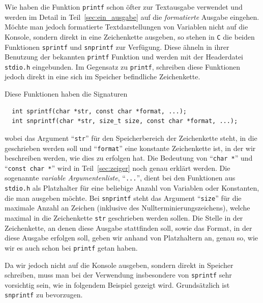 Wie haben die Funktion \texttt{printf} schon öfter zur Textausgabe verwendet und werden im Detail in Teil~\ref{sec:ein_ausgabe} auf die \emph{formatierte} Ausgabe eingehen.
Möchte man jedoch formatierte Textdarstellungen von Variablen nicht auf die Konsole, sondern direkt in eine Zeichenkette ausgeben, so stehen in \texttt{C} die beiden Funktionen \texttt{sprintf} und \texttt{snprintf} zur Verfügung.
Diese ähneln in ihrer Benutzung der bekannten \texttt{printf} Funktion und werden mit der Headerdatei \texttt{stdio.h} eingebunden.
Im Gegensatz zu \texttt{printf}, schreiben diese Funktionen jedoch direkt in eine sich im Speicher befindliche Zeichenkette.

Diese Funktionen haben die Signaturen
\begin{lstlisting}
  int sprintf(char *str, const char *format, ...);
  int snprintf(char *str, size_t size, const char *format, ...);
\end{lstlisting}
wobei das Argument \enquote{\texttt{str}} für den Speicherbereich der Zeichenkette steht, in die geschrieben werden soll und \enquote{\texttt{format}} eine konstante Zeichenkette ist, in der wir beschreiben werden, wie dies zu erfolgen hat.
Die Bedeutung von \enquote{\texttt{char *}} und \enquote{\texttt{const char *}} wird in Teil~\ref{sec:zeiger} noch genau erklärt werden.
Die sogenannte \emph{variable Argumentenliste}, \enquote{\texttt{...}}, dient bei den Funktionen aus \texttt{stdio.h} als Platzhalter für eine beliebige Anzahl von Variablen oder Konstanten, die man ausgeben möchte.
Bei \texttt{snprintf} steht das Argument \enquote{\texttt{size}} für die maximale Anzahl an Zeichen (inklusive des Nullterminierungszeichens), welche maximal in die Zeichenkette \texttt{str} geschrieben werden sollen.
Die Stelle in der Zeichenkette, an denen diese Ausgabe stattfinden soll, sowie das Format, in der diese Ausgabe erfolgen soll, geben wir anhand von Platzhaltern an, genau so, wie wir es auch schon bei \texttt{printf} getan haben.

Da wir jedoch nicht auf die Konsole ausgeben, sondern direkt in Speicher schreiben, muss man bei der Verwendung insbesondere von \texttt{sprintf} sehr vorsichtig sein, wie in folgendem Beispiel gezeigt wird.
Grundsätzlich ist \texttt{snprintf} zu bevorzugen.

